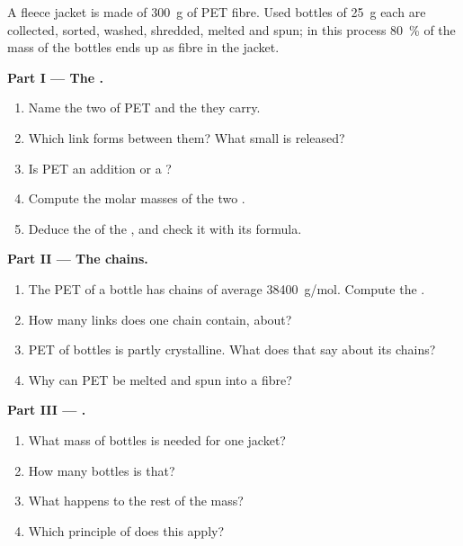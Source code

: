 \begin{problem}
\label{pb:g12:polymers:1}
A fleece jacket is made of \qty{300}{g} of PET fibre. Used bottles of
\qty{25}{g} each are collected, sorted, washed, shredded, melted and spun;
in this process \qty{80}{\percent} of the mass of the bottles ends up as
fibre in the jacket.

\medskip
\noindent\textbf{Part I --- The .}
\begin{enumerate}
  \item Name the two  of PET and the  they
        carry.
  \item Which link forms between them? What small  is released?
  \item Is PET an addition or a ?
  \item Compute the molar masses of the two .
  \item Deduce the  of the  , and check
        it with its formula.
\end{enumerate}

\medskip
\noindent\textbf{Part II --- The chains.}
\begin{enumerate}[resume]
  \item The PET of a bottle has chains of average 
        \qty{38400}{g/mol}. Compute the .
  \item How many  links does one chain contain, about?
  \item PET of bottles is partly crystalline. What does that say about
        its chains?
  \item Why can PET be melted and spun into a fibre?
\end{enumerate}

\medskip
\noindent\textbf{Part III --- .}
\begin{enumerate}[resume]
  \item What mass of bottles is needed for one jacket?
  \item How many bottles is that?
  \item What happens to the rest of the mass?
  \item Which principle of  does this  apply?
\end{enumerate}


\end{problem}
